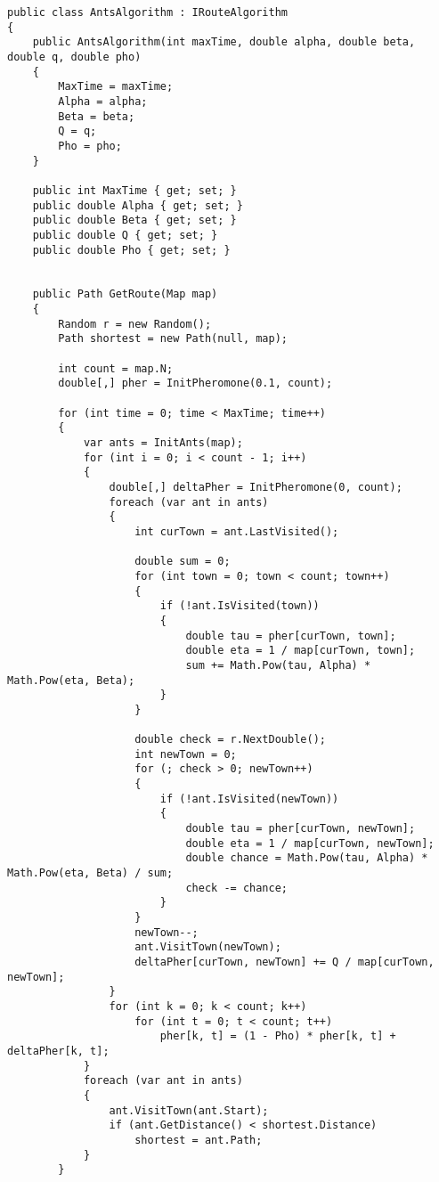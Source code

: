         \begin{lstlisting}[language={[Sharp]C}, label=lst:ant, caption=Реализация муравьиного алгоритма]
public class AntsAlgorithm : IRouteAlgorithm
{
    public AntsAlgorithm(int maxTime, double alpha, double beta, double q, double pho)
    {
        MaxTime = maxTime;
        Alpha = alpha;
        Beta = beta;
        Q = q;
        Pho = pho;
    }

    public int MaxTime { get; set; }
    public double Alpha { get; set; }
    public double Beta { get; set; }
    public double Q { get; set; }
    public double Pho { get; set; }


    public Path GetRoute(Map map)
    {
        Random r = new Random();
        Path shortest = new Path(null, map);

        int count = map.N;
        double[,] pher = InitPheromone(0.1, count);

        for (int time = 0; time < MaxTime; time++)
        {
            var ants = InitAnts(map);
            for (int i = 0; i < count - 1; i++)
            {
                double[,] deltaPher = InitPheromone(0, count);
                foreach (var ant in ants)
                {
                    int curTown = ant.LastVisited();

                    double sum = 0;
                    for (int town = 0; town < count; town++)
                    {
                        if (!ant.IsVisited(town))
                        {
                            double tau = pher[curTown, town];
                            double eta = 1 / map[curTown, town];
                            sum += Math.Pow(tau, Alpha) * Math.Pow(eta, Beta);
                        }
                    }

                    double check = r.NextDouble();
                    int newTown = 0;
                    for (; check > 0; newTown++)
                    {
                        if (!ant.IsVisited(newTown))
                        {
                            double tau = pher[curTown, newTown];
                            double eta = 1 / map[curTown, newTown];
                            double chance = Math.Pow(tau, Alpha) * Math.Pow(eta, Beta) / sum;
                            check -= chance;
                        }
                    }
                    newTown--;
                    ant.VisitTown(newTown);
                    deltaPher[curTown, newTown] += Q / map[curTown, newTown];
                }
                for (int k = 0; k < count; k++)
                    for (int t = 0; t < count; t++)
                        pher[k, t] = (1 - Pho) * pher[k, t] + deltaPher[k, t];
            }
            foreach (var ant in ants)
            {
                ant.VisitTown(ant.Start);
                if (ant.GetDistance() < shortest.Distance)
                    shortest = ant.Path;
            }
        }


\end{lstlisting}
